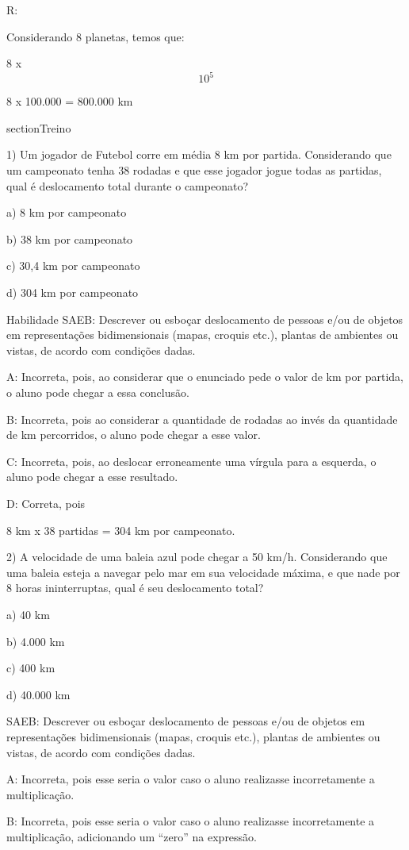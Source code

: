 R:

Considerando 8 planetas, temos que:

8 x \[10^5\]

8 x 100.000 = 800.000 km

section{Treino}

1) Um jogador de Futebol corre em média 8 km por partida. Considerando
que um campeonato tenha 38 rodadas e que esse jogador jogue todas as
partidas, qual é deslocamento total durante o campeonato?

a) 8 km por campeonato

b) 38 km por campeonato

c) 30,4 km por campeonato

d) 304 km por campeonato

Habilidade SAEB: Descrever ou esboçar deslocamento de pessoas e/ou de
objetos em representações bidimensionais (mapas, croquis etc.), plantas
de ambientes ou vistas, de acordo com condições dadas.

A: Incorreta, pois, ao considerar que o enunciado pede o valor de km por
partida, o aluno pode chegar a essa conclusão.

B: Incorreta, pois ao considerar a quantidade de rodadas ao invés da
quantidade de km percorridos, o aluno pode chegar a esse valor.

C: Incorreta, pois, ao deslocar erroneamente uma vírgula para a
esquerda, o aluno pode chegar a esse resultado.

D: Correta, pois

8 km x 38 partidas = 304 km por campeonato.

2) A velocidade de uma baleia azul pode chegar a 50 km/h. Considerando
que uma baleia esteja a navegar pelo mar em sua velocidade máxima, e que
nade por 8 horas ininterruptas, qual é seu deslocamento total?

a) 40 km

b) 4.000 km

c) 400 km

d) 40.000 km

SAEB: Descrever ou esboçar deslocamento de pessoas e/ou de objetos em
representações bidimensionais (mapas, croquis etc.), plantas de
ambientes ou vistas, de acordo com condições dadas.

A: Incorreta, pois esse seria o valor caso o aluno realizasse
incorretamente a multiplicação.

B: Incorreta, pois esse seria o valor caso o aluno realizasse
incorretamente a multiplicação, adicionando um ``zero'' na expressão.

